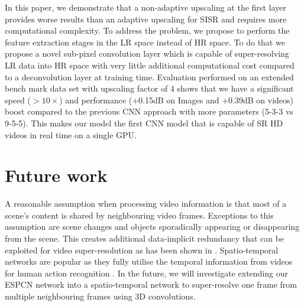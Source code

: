 \documentclass[10pt,twocolumn,letterpaper]{article}
\begin{document}
In this paper, we demonstrate that a non-adaptive upscaling at the first layer provides worse results than an adaptive upscaling for \ac{SISR} and requires more computational complexity. To address the problem, we propose to perform the feature extraction stages in the \ac{LR} space instead of \ac{HR} space. To do that we propose a novel sub-pixel convolution layer which is capable of  super-resolving \ac{LR} data into \ac{HR} space with very little additional computational cost compared to a deconvolution layer \cite{zeiler2011adaptive} at training time. Evaluation performed on an extended bench mark data set with upscaling factor of 4 shows that we have a significant speed ($>10\times$) and performance (+0.15dB on Images and +0.39dB on videos) boost compared to the previous \ac{CNN} approach with more parameters \cite{dong2015image} (5-3-3 vs 9-5-5). This makes our model the first CNN model that is capable of \ac{SR} \ac{HD} videos in real time on a single GPU.


%
\section{Future work}
%

A reasonable assumption when processing video information is that most of a scene's content is shared by neighbouring video frames. Exceptions to this assumption are scene changes and objects sporadically appearing or disappearing from the scene. This creates additional data-implicit redundancy that can be exploited for video super-resolution as has been shown in \cite{shahar2011space,liu2011bayesian}. Spatio-temporal networks are popular as they fully utilise the temporal information from videos for human action recognition \cite{Ji2013,tran2015spatio}. In the future, we will investigate extending our \ac{ESPCN} network into a spatio-temporal network to super-resolve one frame from multiple neighbouring frames using 3D convolutions.

{\footnotesize


}
\end{document}
